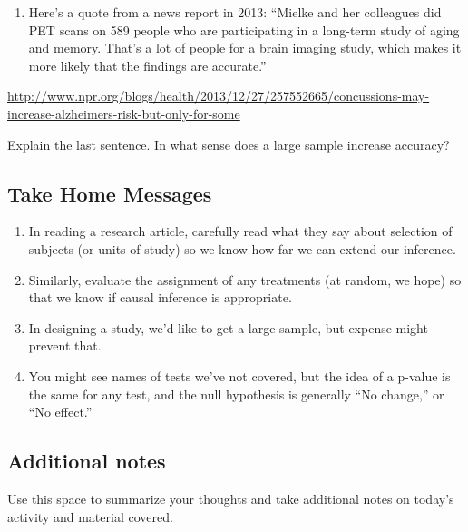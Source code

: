 \documentclass[
]{report}
\providecommand{\tightlist}{%
  \setlength{\itemsep}{0pt}\setlength{\parskip}{0pt}}
\begin{document}
\begin{enumerate}
\def\labelenumi{\arabic{enumi}.}
\setcounter{enumi}{4}
\tightlist
\item
  Here's a quote from a news report in 2013:
  ``Mielke and her colleagues did PET scans on 589 people who are participating in a long-term study of aging and memory. That's a lot of people for a brain imaging study, which makes it more likely that the findings are accurate.''
\end{enumerate}

\url{http://www.npr.org/blogs/health/2013/12/27/257552665/concussions-may-increase-alzheimers-risk-but-only-for-some}

Explain the last sentence. In what sense does a large sample increase accuracy?

\vspace{1in}

\hypertarget{take-home-messages-22}{%
\subsection{Take Home Messages}\label{take-home-messages-22}}

\begin{enumerate}
\def\labelenumi{\arabic{enumi}.}
\item
  In reading a research article, carefully read what they say about selection of subjects (or units of study) so we know how far we can extend our inference.
\item
  Similarly, evaluate the assignment of any treatments (at random, we hope) so that we know if causal inference is appropriate.
\item
  In designing a study, we'd like to get a large sample, but expense might prevent that.
\item
  You might see names of tests we've not covered, but the idea of a p-value is the same for any test, and the null hypothesis is generally ``No change,'' or ``No effect.''
\end{enumerate}

\hypertarget{additional-notes-19}{%
\subsection{Additional notes}\label{additional-notes-19}}

Use this space to summarize your thoughts and take additional notes on today's activity and material covered.

\newpage
\end{document}
